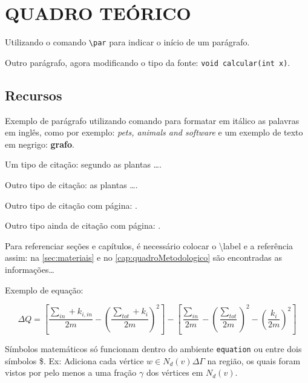 \chapter{QUADRO TEÓRICO}

\par Utilizando o comando \texttt{\textbackslash par} para indicar o início de um parágrafo.
\par Outro parágrafo, agora modificando o tipo da fonte: \texttt{void calcular(int x)}.

\section{Recursos}

\par Exemplo de parágrafo utilizando comando para formatar em itálico as palavras em inglês, como por exemplo: \textit{pets, animals and software} e um exemplo de texto em negrigo: \textbf{grafo}.

\par Um tipo de citação: segundo  as plantas \ldots.

\par Outro tipo de citação: as plantas \ldots \cite{correa2003plantas}.

\par Outro tipo de citação com página: \cite[p. 13]{correa2003plantas}.
\par Outro tipo ainda de citação com página:  .

\par Para referenciar seções e capítulos, é necessário colocar o \textbackslash label e a referência assim: na \autoref{sec:materiais} e no \autoref{cap:quadroMetodologico} são encontradas as informações\ldots

\par Exemplo de equação:

\begin{equation}
 \Delta Q = 
 \left[
 \frac{\sum_{in} + k_{i,in}}{2m} - 
 \left(
 \frac{\sum_{tot} + k_i}{2m}
 \right)^2
 \right] -
 \left[
 \frac{\sum_{in}}{2m} - 
 \left(\frac{\sum_{tot}}{2m}
 \right)^2 - 
 \left(\frac{k_i}{2m}
 \right)^2
 \right]
\end{equation}


\par Símbolos matemáticos só funcionam dentro do ambiente \texttt{equation} ou entre dois símbolos \$. Ex: Adiciona cada vértice $w \in N_d(v) \Delta \Gamma$ na região, os quais foram vistos por pelo menos a uma fração $\gamma$ dos vértices em $N_d(v)$.

